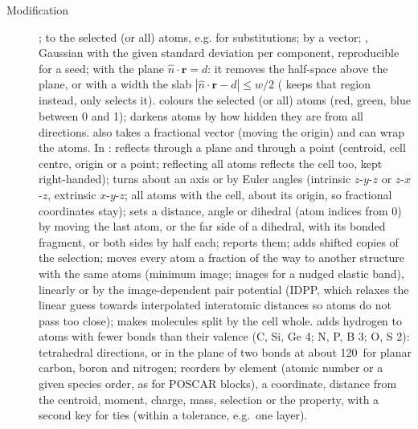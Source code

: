 \begin{description}
\item[Modification] ;  to the selected (or all) atoms, e.g. for substitutions;  by a vector; , Gaussian with the given standard deviation per component, reproducible for a seed;  with the plane $\hat n\cdot\mathbf r = d$: it removes the half-space above the plane, or with a width the slab $|\hat n\cdot\mathbf r - d| \le w/2$ ( keeps that region instead,  only selects it).  colours the selected (or all) atoms (red, green, blue between 0 and 1);  darkens atoms by how hidden they are from all directions.  also takes a fractional vector (moving the origin) and can wrap the atoms. In :  reflects through a plane and  through a point (centroid, cell centre, origin or a point; reflecting all atoms reflects the cell too, kept right-handed);  turns about an axis or by Euler angles (intrinsic $z$-$y$-$z$ or $z$-$x$-$z$, extrinsic $x$-$y$-$z$; all atoms with the cell, about its origin, so fractional coordinates stay);  sets a distance, angle or dihedral (atom indices from 0) by moving the last atom, or the far side of a dihedral, with its bonded fragment, or both sides by half each;  reports them;  adds shifted copies of the selection;  moves every atom a fraction of the way to another structure with the same atoms (minimum image; images for a nudged elastic band), linearly or by the image-dependent pair potential (IDPP, which relaxes the linear guess towards interpolated interatomic distances so atoms do not pass too close);  makes molecules split by the cell whole.  adds hydrogen to atoms with fewer bonds than their valence (C, Si, Ge 4; N, P, B 3; O, S 2): tetrahedral directions, or in the plane of two bonds at about 120\textdegree\ for planar carbon, boron and nitrogen;  reorders by element (atomic number or a given species order, as for POSCAR blocks), a coordinate, distance from the centroid, moment, charge, mass, selection or the property, with a second key for ties (within a tolerance, e.g.\ one layer).

\end{description}
